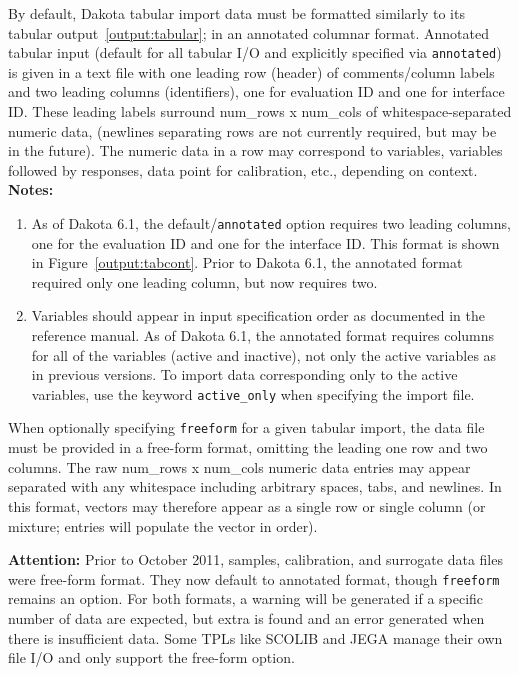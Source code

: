 By default, Dakota tabular import data must be formatted similarly to
its tabular output~\ref{output:tabular}; in an annotated columnar
format.  Annotated tabular input (default for all tabular I/O and
explicitly specified via {\tt annotated}) is given in a text file with
one leading row (header) of comments/column labels and two leading
columns (identifiers), one for evaluation ID and one for interface ID.
These leading labels surround num\_rows x num\_cols of
whitespace-separated numeric data, (newlines separating rows are not
currently required, but may be in the future).  The numeric data in a
row may correspond to variables, variables followed by responses, data
point for calibration, etc., depending on context.  {\bf Notes:}
\begin{enumerate}
\item As of Dakota 6.1, the default/\texttt{annotated} option requires
  two leading columns, one for the evaluation ID and one for the
  interface ID.  This format is shown in Figure~\ref{output:tabcont}.
  Prior to Dakota 6.1, the annotated format required only one leading
  column, but now requires two.

\item Variables should appear in input specification order as
  documented in the reference manual.  As of Dakota 6.1, the annotated
  format requires columns for all of the variables (active and
  inactive), not only the active variables as in previous versions.
  To import data corresponding only to the active variables, use the
  keyword \texttt{active\_only} when specifying the import file.
\end{enumerate}

When optionally specifying \texttt{freeform} for a given tabular
import, the data file must be provided in a free-form format, omitting
the leading one row and two columns. The raw num\_rows x num\_cols
numeric data entries may appear separated with any whitespace
including arbitrary spaces, tabs, and newlines.  In this format,
vectors may therefore appear as a single row or single column (or
mixture; entries will populate the vector in order).

{\bf Attention:} Prior to October 2011, samples, calibration, and
surrogate data files were free-form format.  They now default to
annotated format, though {\tt freeform} remains an option.  For both
formats, a warning will be generated if a specific number of data are
expected, but extra is found and an error generated when there is
insufficient data.  Some TPLs like SCOLIB and JEGA manage their own
file I/O and only support the free-form option.


